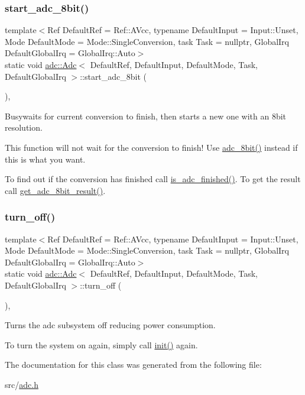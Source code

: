 \subsubsection{\texorpdfstring{start\+\_\+adc\+\_\+8bit()}{start\_adc\_8bit()}}
{\footnotesize\ttfamily template$<$Ref Default\+Ref = Ref\+::\+A\+Vcc, typename Default\+Input  = Input\+::\+Unset, Mode Default\+Mode = Mode\+::\+Single\+Conversion, task Task = nullptr, Global\+Irq Default\+Global\+Irq = Global\+Irq\+::\+Auto$>$ \\
static void \hyperlink{classadc_1_1Adc}{adc\+::\+Adc}$<$ Default\+Ref, Default\+Input, Default\+Mode, Task, Default\+Global\+Irq $>$\+::start\+\_\+adc\+\_\+8bit (\begin{DoxyParamCaption}{ }\end{DoxyParamCaption})\hspace{0.3cm}{\ttfamily [inline]}, {\ttfamily [static]}}



Busywaits for current conversion to finish, then starts a new one with an 8bit resolution. 

This function will not wait for the conversion to finish! Use \hyperlink{classadc_1_1Adc_ae289bfed72b4cfab79dae680cc4d9ab4}{adc\+\_\+8bit()} instead if this is what you want.

To find out if the conversion has finished call \hyperlink{classadc_1_1Adc_a76738f38cfbc9380c244867c754e1e62}{is\+\_\+adc\+\_\+finished()}. To get the result call \hyperlink{classadc_1_1Adc_a780877e68b2f2d61596e594db04179ed}{get\+\_\+adc\+\_\+8bit\+\_\+result()}. \hypertarget{classadc_1_1Adc_a0c1266c2f27fefea08595aaf26762f26}{}\label{classadc_1_1Adc_a0c1266c2f27fefea08595aaf26762f26} 
\subsubsection{\texorpdfstring{turn\+\_\+off()}{turn\_off()}}
{\footnotesize\ttfamily template$<$Ref Default\+Ref = Ref\+::\+A\+Vcc, typename Default\+Input  = Input\+::\+Unset, Mode Default\+Mode = Mode\+::\+Single\+Conversion, task Task = nullptr, Global\+Irq Default\+Global\+Irq = Global\+Irq\+::\+Auto$>$ \\
static void \hyperlink{classadc_1_1Adc}{adc\+::\+Adc}$<$ Default\+Ref, Default\+Input, Default\+Mode, Task, Default\+Global\+Irq $>$\+::turn\+\_\+off (\begin{DoxyParamCaption}{ }\end{DoxyParamCaption})\hspace{0.3cm}{\ttfamily [inline]}, {\ttfamily [static]}}



Turns the adc subsystem off reducing power consumption. 

To turn the system on again, simply call \hyperlink{classadc_1_1Adc_a146fe898e16915e9b344019c59cdcfa3}{init()} again. 

The documentation for this class was generated from the following file\+:\begin{DoxyCompactItemize}
\item 
src/\hyperlink{adc_8h}{adc.\+h}\end{DoxyCompactItemize}
